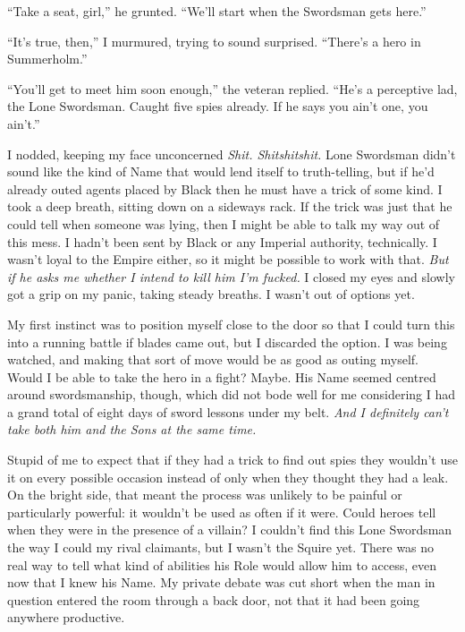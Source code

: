 \documentclass[12pt, openany]{book}
\begin{document}
“Take a seat, girl,” he grunted. “We’ll start when the Swordsman gets here.”

“It’s true, then,” I murmured, trying to sound surprised. “There’s a hero in Summerholm.”

“You’ll get to meet him soon enough,” the veteran replied. “He’s a perceptive lad, the Lone Swordsman. Caught five spies already. If he says you ain’t one, you ain’t.”

I nodded, keeping my face unconcerned \textit{Shit. Shitshitshit.} Lone Swordsman didn’t sound like the kind of Name that would lend itself to truth-telling, but if he’d already outed agents placed by Black then he must have a trick of some kind. I took a deep breath, sitting down on a sideways rack. If the trick was just that he could tell when someone was lying, then I might be able to talk my way out of this mess. I hadn’t been sent by Black or any Imperial authority, technically. I wasn’t loyal to the Empire either, so it might be possible to work with that. \textit{But if he asks me whether I intend to kill him I’m fucked.} I closed my eyes and slowly got a grip on my panic, taking steady breaths. I wasn’t out of options yet. 

My first instinct was to position myself close to the door so that I could turn this into a running battle if blades came out, but I discarded the option. I was being watched, and making that sort of move would be as good as outing myself. Would I be able to take the hero in a fight? Maybe. His Name seemed centred around swordsmanship, though, which did not bode well for me considering I had a grand total of eight days of sword lessons under my belt. \textit{And I definitely can’t take both him and the Sons at the same time.}

Stupid of me to expect that if they had a trick to find out spies they wouldn’t use it on every possible occasion instead of only when they thought they had a leak. On the bright side, that meant the process was unlikely to be painful or particularly powerful: it wouldn’t be used as often if it were. Could heroes tell when they were in the presence of a villain? I couldn’t find this Lone Swordsman the way I could my rival claimants, but I wasn’t the Squire yet. There was no real way to tell what kind of abilities his Role would allow him to access, even now that I knew his Name. My private debate was cut short when the man in question entered the room through a back door, not that it had been going anywhere productive.
\end{document}
